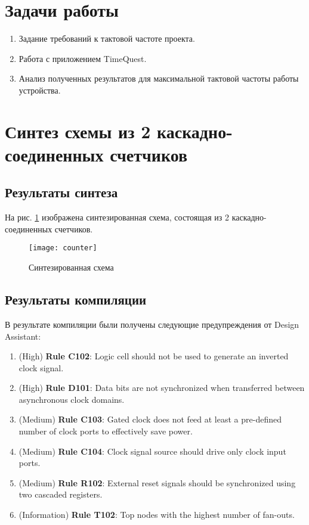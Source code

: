 





\tableofcontents
\listoffigures
\lstlistoflistings
\newpage

\section{Задачи работы}

\begin{enumerate}
	\setlength\itemsep{0em}
	\item Задание требований к тактовой частоте проекта.
	\item Работа с приложением TimeQuest.
	\item Анализ полученных результатов для максимальной тактовой частоты работы устройства.
\end{enumerate}

\section{Синтез схемы из 2 каскадно-соединенных счетчиков}

\subsection{Результаты синтеза}

На рис. \ref{fig:counter} изображена синтезированная схема, состоящая из 2 каскадно-соединенных счетчиков.

\begin{figure}[H]
\begin{center}
	\texttt{[image: counter]}
	\caption{Синтезированная схема}
	\label{fig:counter}
\end{center}
\end{figure}

\subsection{Результаты компиляции}

В результате компиляции были получены следующие предупреждения от Design Assistant:
\begin{enumerate}
	\setlength\itemsep{0em}
	\item (High) \textbf{Rule C102}: Logic cell should not be used to generate an inverted clock signal.
	\item (High) \textbf{Rule D101}: Data bits are not synchronized when transferred between asynchronous clock domains.
	\item (Medium) \textbf{Rule C103}: Gated clock does not feed at least a pre-defined number of clock ports to effectively save power.
	\item (Medium) \textbf{Rule C104}: Clock signal source should drive only clock input ports.
	\item (Medium) \textbf{Rule R102}: External reset signals should be synchronized using two cascaded registers. 
	\item (Information) \textbf{Rule T102}: Top nodes with the highest number of fan-outs.
\end{enumerate}

